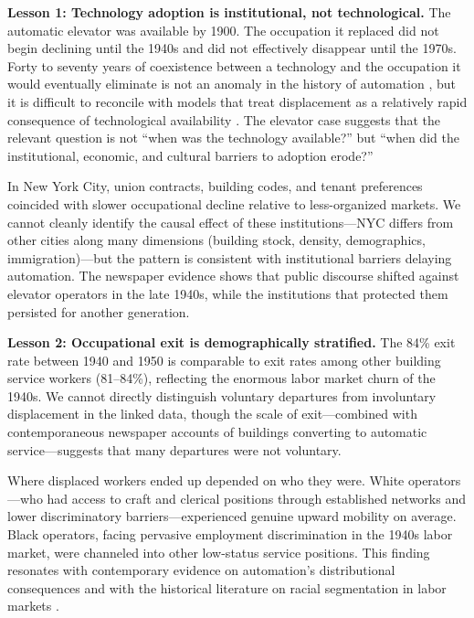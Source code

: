 \documentclass[12pt]{article}
\begin{document}
\textbf{Lesson 1: Technology adoption is institutional, not technological.} The automatic elevator was available by 1900. The occupation it replaced did not begin declining until the 1940s and did not effectively disappear until the 1970s. Forty to seventy years of coexistence between a technology and the occupation it would eventually eliminate is not an anomaly in the history of automation \citep{mokyr1992}, but it is difficult to reconcile with models that treat displacement as a relatively rapid consequence of technological availability \citep{acemoglu2020}. The elevator case suggests that the relevant question is not ``when was the technology available?'' but ``when did the institutional, economic, and cultural barriers to adoption erode?''

In New York City, union contracts, building codes, and tenant preferences coincided with slower occupational decline relative to less-organized markets. We cannot cleanly identify the causal effect of these institutions---NYC differs from other cities along many dimensions (building stock, density, demographics, immigration)---but the pattern is consistent with institutional barriers delaying automation. The newspaper evidence shows that public discourse shifted against elevator operators in the late 1940s, while the institutions that protected them persisted for another generation.

\textbf{Lesson 2: Occupational exit is demographically stratified.} The 84\% exit rate between 1940 and 1950 is comparable to exit rates among other building service workers (81--84\%), reflecting the enormous labor market churn of the 1940s. We cannot directly distinguish voluntary departures from involuntary displacement in the linked data, though the scale of exit---combined with contemporaneous newspaper accounts of buildings converting to automatic service---suggests that many departures were not voluntary.

Where displaced workers ended up depended on who they were. White operators---who had access to craft and clerical positions through established networks and lower discriminatory barriers---experienced genuine upward mobility on average. Black operators, facing pervasive employment discrimination in the 1940s labor market, were channeled into other low-status service positions. This finding resonates with contemporary evidence on automation's distributional consequences \citep{acemoglu2020, autor2024} and with the historical literature on racial segmentation in labor markets \citep{sundstrom1994}.
\end{document}

